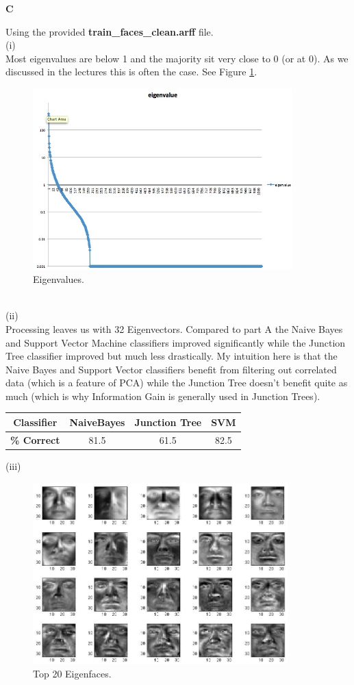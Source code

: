 \documentclass{report}
\begin{document}
\begin{center}{\bf \LARGE{C}}\end{center}
Using the provided {\bf train\_faces\_clean.arff} file.\\
(i)\\
Most eigenvalues are below 1 and the majority sit very close to 0 (or
at 0). As we discussed in the lectures this is often the
case. See Figure \ref{fig:eigen}.\\
\begin{figure}[h]
  \centering
  \includegraphics[height=70mm]{images/CiEigen.jpg}
  \caption{Eigenvalues.}
  \label{fig:eigen}
\end{figure}\\
(ii)\\
Processing leaves us with 32 Eigenvectors. Compared to part A the
Naive Bayes and Support Vector Machine classifiers improved significantly
while the Junction Tree classifier improved but much less
drastically. My intuition here is that the Naive Bayes and Support
Vector classifiers benefit from filtering out correlated data (which
is a feature of PCA) while the Junction Tree doesn't benefit quite as
much (which is why Information Gain is generally used in Junction Trees).
\begin{center}
  \begin{tabular}{|c|c|c|c|}
    \hline
    {\bf Classifier} & {\bf NaiveBayes} & {\bf Junction Tree} & {\bf SVM}\\
    \hline
    {\bf \% Correct} & 81.5 & 61.5 & 82.5\\
    \hline
  \end{tabular}
\end{center}
(iii)\\
\begin{figure}[h]
  \centering
  \includegraphics[height=70mm]{images/CiiiFaces.jpg}
  \caption{Top 20 Eigenfaces.}
  \label{fig}
\end{figure}\\
\end{document}
